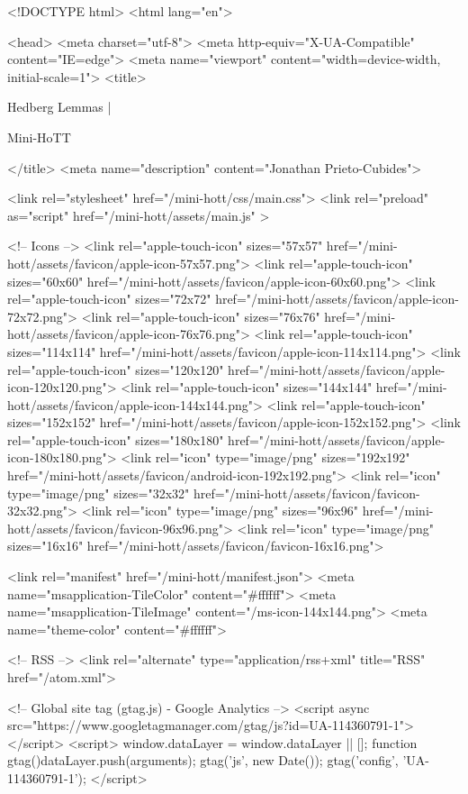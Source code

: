 <!DOCTYPE html>
<html lang="en">

<head>
  <meta charset="utf-8">
  <meta http-equiv="X-UA-Compatible" content="IE=edge">
  <meta name="viewport" content="width=device-width, initial-scale=1">
  <title>
    
      
        Hedberg Lemmas |
      
        Mini-HoTT
    
  </title>
  <meta name="description" content="Jonathan Prieto-Cubides">

  <link rel="stylesheet" href="/mini-hott/css/main.css">
  <link rel="preload" as="script" href="/mini-hott/assets/main.js" >

  <!-- Icons -->
  <link rel="apple-touch-icon" sizes="57x57" href="/mini-hott/assets/favicon/apple-icon-57x57.png">
  <link rel="apple-touch-icon" sizes="60x60" href="/mini-hott/assets/favicon/apple-icon-60x60.png">
  <link rel="apple-touch-icon" sizes="72x72" href="/mini-hott/assets/favicon/apple-icon-72x72.png">
  <link rel="apple-touch-icon" sizes="76x76" href="/mini-hott/assets/favicon/apple-icon-76x76.png">
  <link rel="apple-touch-icon" sizes="114x114" href="/mini-hott/assets/favicon/apple-icon-114x114.png">
  <link rel="apple-touch-icon" sizes="120x120" href="/mini-hott/assets/favicon/apple-icon-120x120.png">
  <link rel="apple-touch-icon" sizes="144x144" href="/mini-hott/assets/favicon/apple-icon-144x144.png">
  <link rel="apple-touch-icon" sizes="152x152" href="/mini-hott/assets/favicon/apple-icon-152x152.png">
  <link rel="apple-touch-icon" sizes="180x180" href="/mini-hott/assets/favicon/apple-icon-180x180.png">
  <link rel="icon" type="image/png" sizes="192x192"  href="/mini-hott/assets/favicon/android-icon-192x192.png">
  <link rel="icon" type="image/png" sizes="32x32" href="/mini-hott/assets/favicon/favicon-32x32.png">
  <link rel="icon" type="image/png" sizes="96x96" href="/mini-hott/assets/favicon/favicon-96x96.png">
  <link rel="icon" type="image/png" sizes="16x16" href="/mini-hott/assets/favicon/favicon-16x16.png">

  <link rel="manifest" href="/mini-hott/manifest.json">
  <meta name="msapplication-TileColor" content="#ffffff">
  <meta name="msapplication-TileImage" content="/ms-icon-144x144.png">
  <meta name="theme-color" content="#ffffff">

  <!-- RSS -->
  <link rel="alternate" type="application/rss+xml" title="RSS" href="/atom.xml">

  <!-- Global site tag (gtag.js) - Google Analytics -->
  <script async src="https://www.googletagmanager.com/gtag/js?id=UA-114360791-1"></script>
  <script>
    window.dataLayer = window.dataLayer || [];
    function gtag(){dataLayer.push(arguments);}
    gtag('js', new Date());
    gtag('config', 'UA-114360791-1');
  </script>

